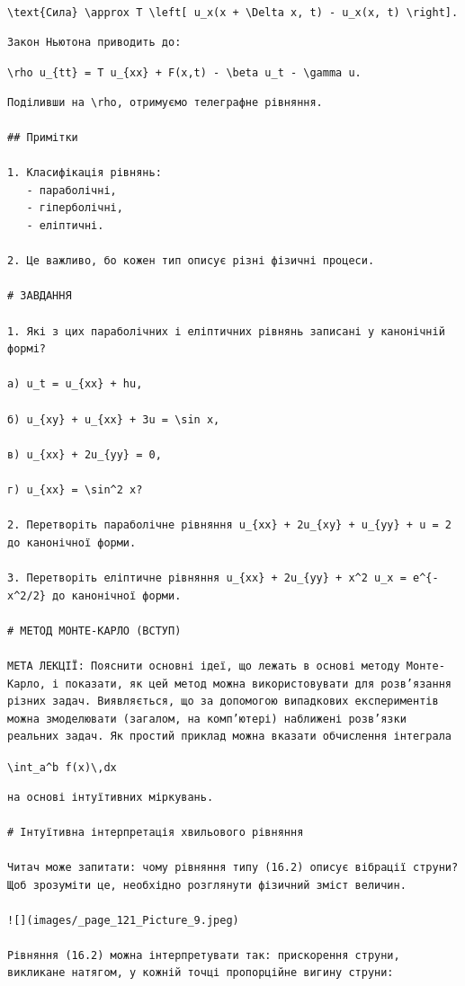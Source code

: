 \documentclass[
  ukrainian,
]{article}
\begin{document}
\texttt{\textbackslash{}text\{Сила\}\ \textbackslash{}approx\ T\ \textbackslash{}left{[}\ u\_x(x\ +\ \textbackslash{}Delta\ x,\ t)\ -\ u\_x(x,\ t)\ \textbackslash{}right{]}.}

\begin{verbatim}
Закон Ньютона приводить до:
\end{verbatim}

\texttt{\textbackslash{}rho\ u\_\{tt\}\ =\ T\ u\_\{xx\}\ +\ F(x,t)\ -\ \textbackslash{}beta\ u\_t\ -\ \textbackslash{}gamma\ u.}

\begin{verbatim}
Поділивши на \rho, отримуємо телеграфне рівняння.

## Примітки

1. Класифікація рівнянь:
   - параболічні,
   - гіперболічні,
   - еліптичні.

2. Це важливо, бо кожен тип описує різні фізичні процеси.

# ЗАВДАННЯ

1. Які з цих параболічних і еліптичних рівнянь записані у канонічній формі?

a) u_t = u_{xx} + hu,

б) u_{xy} + u_{xx} + 3u = \sin x,

в) u_{xx} + 2u_{yy} = 0,

г) u_{xx} = \sin^2 x?

2. Перетворіть параболічне рівняння u_{xx} + 2u_{xy} + u_{yy} + u = 2 до канонічної форми.

3. Перетворіть еліптичне рівняння u_{xx} + 2u_{yy} + x^2 u_x = e^{-x^2/2} до канонічної форми.

# МЕТОД МОНТЕ-КАРЛО (ВСТУП)

МЕТА ЛЕКЦІЇ: Пояснити основні ідеї, що лежать в основі методу Монте-Карло, і показати, як цей метод можна використовувати для розв’язання різних задач. Виявляється, що за допомогою випадкових експериментів можна змоделювати (загалом, на комп’ютері) наближені розв’язки реальних задач. Як простий приклад можна вказати обчислення інтеграла
\end{verbatim}

\texttt{\textbackslash{}int\_a\^{}b\ f(x)\textbackslash{},dx}

\begin{verbatim}
на основі інтуїтивних міркувань.

# Інтуїтивна інтерпретація хвильового рівняння

Читач може запитати: чому рівняння типу (16.2) описує вібрації струни? Щоб зрозуміти це, необхідно розглянути фізичний зміст величин.

![](images/_page_121_Picture_9.jpeg)

Рівняння (16.2) можна інтерпретувати так: прискорення струни, викликане натягом, у кожній точці пропорційне вигину струни:
\end{verbatim}
\end{document}
